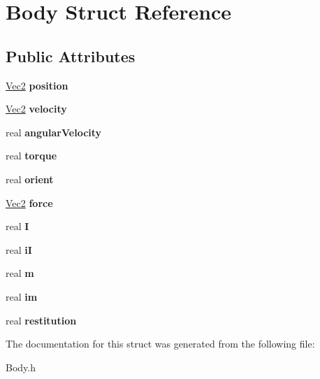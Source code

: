 \hypertarget{struct_body}{}\section{Body Struct Reference}
\label{struct_body}
\subsection*{Public Attributes}
\begin{DoxyCompactItemize}
\item 
\mbox{\label{struct_body_a659001c4570d0ad46bf609ab06447860}} 
\mbox{\hyperlink{struct_vec2}{Vec2}} {\bfseries position}
\item 
\mbox{\label{struct_body_a3723eaa2db4c9a3ac68b9745e11a0a40}} 
\mbox{\hyperlink{struct_vec2}{Vec2}} {\bfseries velocity}
\item 
\mbox{\label{struct_body_a78f0f4d1c6a6b9efaefd5a03bd8de598}} 
real {\bfseries angular\+Velocity}
\item 
\mbox{\label{struct_body_a269761d1be497882d3f3a2aef4847152}} 
real {\bfseries torque}
\item 
\mbox{\label{struct_body_a93534f084248dd60be496754361c1a22}} 
real {\bfseries orient}
\item 
\mbox{\label{struct_body_a0399faa61bf3850a1dacb2ed3f377ba5}} 
\mbox{\hyperlink{struct_vec2}{Vec2}} {\bfseries force}
\item 
\mbox{\label{struct_body_a48ced797496c1cd5bf4175cfc16c2364}} 
real {\bfseries I}
\item 
\mbox{\label{struct_body_abab39f15217fc548e93a27eeda630c20}} 
real {\bfseries iI}
\item 
\mbox{\label{struct_body_abbf210246f192562bf8809f2b2c3e238}} 
real {\bfseries m}
\item 
\mbox{\label{struct_body_a500c28fac5382a812430a095f35d355f}} 
real {\bfseries im}
\item 
\mbox{\label{struct_body_aa57d627e73de706e87540b07b61d867a}} 
real {\bfseries restitution}
\end{DoxyCompactItemize}


The documentation for this struct was generated from the following file\+:\begin{DoxyCompactItemize}
\item 
Body.\+h\end{DoxyCompactItemize}
